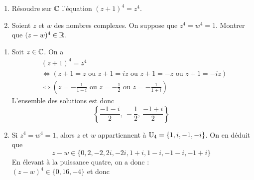 \begin{exo}
\begin{enumerate}
\item Résoudre sur $\mathbb{C}$ l'équation $(z+1)^4=z^4$.
\item Soient $z$ et $w$ des nombres complexes. On suppose que $z^4=w^4=1$. Montrer que $(z-w)^4\in\mathbb{R}$.
\end{enumerate}
\begin{sol}
\begin{enumerate}
\item Soit $z\in \mathbb{C}$. On a 
\begin{align*}
& (z+1)^4=z^4\\
 &\iff (z+1=z \text{ ou } z+1=iz\text{ ou }z+1=-z\text{ ou }z+1=-iz)\\
&\iff \left(z=-\frac{1}{1-i}\text{ ou } z=-\frac{1}{2}\text{ ou } z=-\frac{1}{1+i}\right)
\end{align*}
L'ensemble des solutions est donc
\[ \left\{\frac{-1-i}{2},\:  -\frac{1}{2},\: \frac{-1+i}{2} \right\}\]
\item Si $z^4=w^4=1$, alors $z$ et $w$ appartiennent à $\mathbb{U}_4=\{1,i,-1,-i\}$. On en déduit que 
\[ z-w \in \{0, 2,-2, 2i, -2i, 1+i, 1-i, -1-i, -1+i\}\]
En élevant à la puissance quatre, on a donc :\\
$(z-w)^4  \in \{0, 16,-4 \}$ et donc 

\end{enumerate}
\end{sol}
\end{exo}





